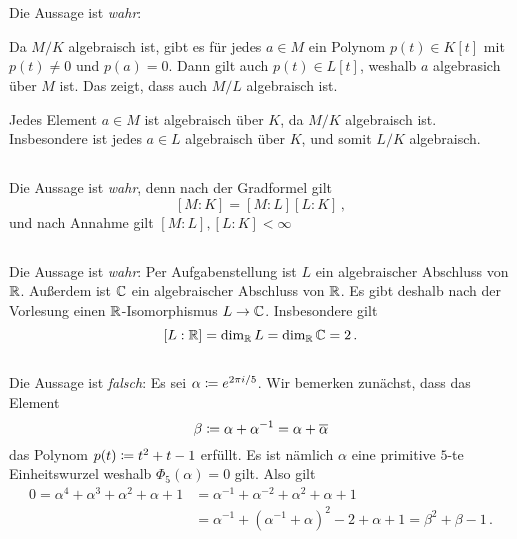 \section{}





\subsection{}

Die Aussage ist \emph{wahr}:

Da $M/K$ algebraisch ist, gibt es für jedes $a \in M$ ein Polynom $p(t) \in K[t]$ mit $p(t) \neq 0$ und $p(a) = 0$.
Dann gilt auch $p(t) \in L[t]$, weshalb $a$ algebrasich über $M$ ist.
Das zeigt, dass auch $M/L$ algebraisch ist.

Jedes Element $a \in M$ ist algebraisch über $K$, da $M/K$ algebraisch ist.
Insbesondere ist jedes $a \in L$ algebraisch über $K$, und somit $L/K$ algebraisch.





\subsection{}

Die Aussage ist \emph{wahr}, denn nach der Gradformel gilt
\[
    [M : K]
  = [M : L][L : K] \,,
\]
und nach Annahme gilt $[M : L], [L : K] < \infty$





\subsection{}

Die Aussage ist \emph{wahr}:
Per Aufgabenstellung ist $L$ ein algebraischer Abschluss von $\mathbb{R}$.
Außerdem ist $\mathbb{C}$ ein algebraischer Abschluss von $\mathbb{R}$.
Es gibt deshalb nach der Vorlesung einen $\mathbb{R}$-Isomorphismus $L \to \mathbb{C}$.
Insbesondere gilt
\[
    [L : \mathbb{R}]
  = \dim_{\mathbb{R}} L
  = \dim_{\mathbb{R}} \mathbb{C}
  = 2 \,.
\]





\subsection{}

Die Aussage ist \emph{falsch}:
Es sei $\alpha \coloneqq e^{2 \pi i / 5}$.
Wir bemerken zunächst, dass das Element
\[
          \beta
  \coloneqq \alpha + \alpha^{-1}
  =       \alpha + \overline{\alpha}
\]
das Polynom $p(t) \coloneqq t^2 + t - 1$ erfüllt.
Es ist nämlich $\alpha$ eine primitive $5$-te Einheitswurzel weshalb $\Phi_5(\alpha) = 0$ gilt.
Also gilt
\begin{align*}
      0
   =  \alpha^4 + \alpha^3 + \alpha^2 + \alpha + 1
  &=  \alpha^{-1} + \alpha^{-2} + \alpha^2 + \alpha + 1
  \\
  &=  \alpha^{-1} + (\alpha^{-1} + \alpha)^2 - 2 + \alpha + 1
   =  \beta^2 + \beta - 1 \,.
\end{align*}

